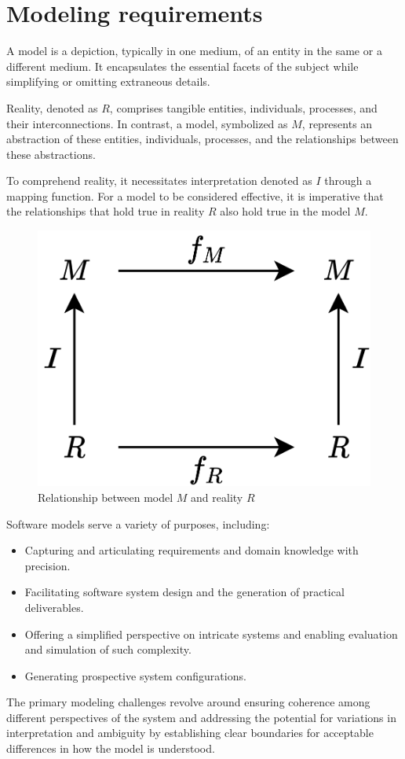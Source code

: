 \section{Modeling requirements}

\begin{definition}
    A model is a depiction, typically in one medium, of an entity in the same or a different medium.
    It encapsulates the essential facets of the subject while simplifying or omitting extraneous details.
\end{definition}
Reality, denoted as $R$, comprises tangible entities, individuals, processes, and their interconnections. 
In contrast, a model, symbolized as $M$, represents an abstraction of these entities, individuals, processes, and the relationships between these abstractions.

To comprehend reality, it necessitates interpretation denoted as $I$ through a mapping function.
For a model to be considered effective, it is imperative that the relationships that hold true in reality $R$ also hold true in the model $M$.
\begin{figure}[H]
    \centering
    \includegraphics[width=0.35\linewidth]{images/modeling.png}
    \caption{Relationship between model $M$ and reality $R$}
\end{figure}
Software models serve a variety of purposes, including:
\begin{itemize}
    \item Capturing and articulating requirements and domain knowledge with precision.
    \item Facilitating software system design and the generation of practical deliverables.
    \item Offering a simplified perspective on intricate systems and enabling evaluation and simulation of such complexity.
    \item Generating prospective system configurations.
\end{itemize}
The primary modeling challenges revolve around ensuring coherence among different perspectives of the system and addressing the potential for variations in interpretation and ambiguity by establishing clear boundaries for acceptable differences in how the model is understood.
 
